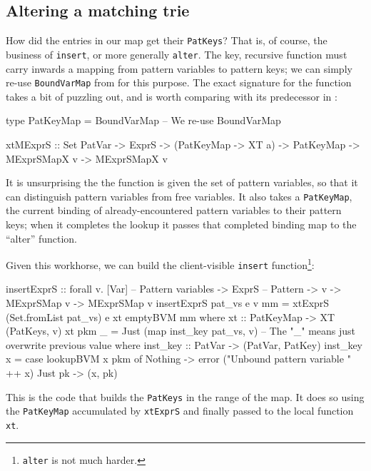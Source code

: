 \documentclass[acmsmall]{acmart}
\theoremstyle{theorem}
\theoremstyle{definition}
\theoremstyle{remark}
\begin{document}
\subsection{Altering a matching trie}


How did the entries in our map get their \lstinline{PatKeys}?  That
is, of course, the business of \lstinline{insert}, or more generally
\lstinline{alter}.  The key, recursive function must carry inwards a mapping
from pattern variables to pattern keys; we can simply re-use \lstinline{BoundVarMap}
from  for this purpose.  The exact signature for the function takes
a bit of puzzling out, and is worth comparing with its predecessor in :
\begin{code}
type PatKeyMap = BoundVarMap   -- We re-use BoundVarMap

xtMExprS :: Set PatVar -> ExprS -> (PatKeyMap -> XT a)
         -> PatKeyMap -> MExprSMapX v -> MExprSMapX v
\end{code}
It is unsurprising the the function is given the set of pattern variables, so that it
can distinguish pattern variables from free variables.  It also takes a \lstinline{PatKeyMap}, the
current binding of already-encountered pattern variables to their pattern keys;
when it completes the lookup it passes that completed binding map to the ``alter'' function.

Given this workhorse, we can build the client-visible \lstinline{insert} function\footnote{\lstinline{alter} is not much harder.}:
\begin{code}
insertExprS :: forall v. [Var]     -- Pattern variables
                         -> ExprS  -- Pattern
                         -> v -> MExprSMap v -> MExprSMap v
insertExprS pat_vs e v mm
  = xtExprS (Set.fromList pat_vs) e xt emptyBVM mm
  where
    xt :: PatKeyMap -> XT (PatKeys, v)
    xt pkm _ = Just (map inst_key pat_vs, v)
     -- The "_" means just overwrite previous value
     where
        inst_key :: PatVar -> (PatVar, PatKey)
        inst_key x = case lookupBVM x pkm of
                         Nothing -> error ("Unbound pattern variable " ++ x)
                         Just pk -> (x, pk)
\end{code}
This is the code that builds the \lstinline{PatKeys} in the range of the map.
It does so using the \lstinline{PatKeyMap} accumulated by \lstinline{xtExprS} and
finally passed to the local function \lstinline{xt}.
\end{document}
